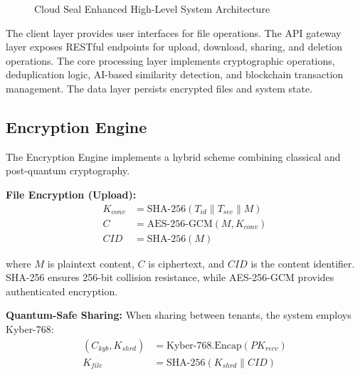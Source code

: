 \documentclass[conference]{IEEEtran}
\begin{document}
\begin{figure}[htbp]
\caption{Cloud Seal Enhanced High-Level System Architecture}
\label{fig:architecture}
\end{figure}

The client layer provides user interfaces for file operations. The API gateway layer exposes RESTful endpoints for upload, download, sharing, and deletion operations. The core processing layer implements cryptographic operations, deduplication logic, AI-based similarity detection, and blockchain transaction management. The data layer persists encrypted files and system state.

\subsection{Encryption Engine}
The Encryption Engine implements a hybrid scheme combining classical and post-quantum cryptography.

\textbf{File Encryption (Upload):}
\begin{equation}
\label{eq:convergent}
\begin{split}
K_{conv} &= \text{SHA-256}(T_{id} \parallel T_{sec} \parallel M) \\
C &= \text{AES-256-GCM}(M, K_{conv}) \\
CID &= \text{SHA-256}(M)
\end{split}
\end{equation}

where $M$ is plaintext content, $C$ is ciphertext, and $CID$ is the content identifier. SHA-256 ensures 256-bit collision resistance, while AES-256-GCM provides authenticated encryption.

\textbf{Quantum-Safe Sharing:}
When sharing between tenants, the system employs Kyber-768:
\begin{equation}
\label{eq:kyber}
\begin{split}
(C_{kyb}, K_{shrd}) &= \text{Kyber-768.Encap}(PK_{recv}) \\
K_{file} &= \text{SHA-256}(K_{shrd} \parallel CID)
\end{split}
\end{equation}
\end{document}
